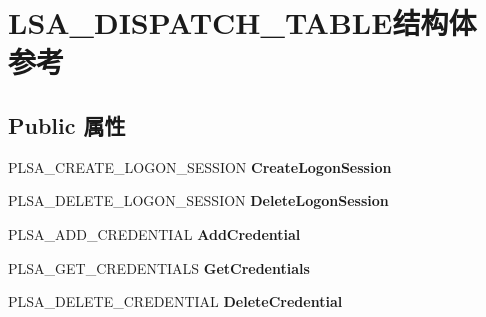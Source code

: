 \hypertarget{struct_l_s_a___d_i_s_p_a_t_c_h___t_a_b_l_e}{}\section{L\+S\+A\+\_\+\+D\+I\+S\+P\+A\+T\+C\+H\+\_\+\+T\+A\+B\+L\+E结构体 参考}
\label{struct_l_s_a___d_i_s_p_a_t_c_h___t_a_b_l_e}
\subsection*{Public 属性}
\begin{DoxyCompactItemize}
\item 
\mbox{\label{struct_l_s_a___d_i_s_p_a_t_c_h___t_a_b_l_e_a252ce35f4f1f431226b72b2f27a5a7ea}} 
P\+L\+S\+A\+\_\+\+C\+R\+E\+A\+T\+E\+\_\+\+L\+O\+G\+O\+N\+\_\+\+S\+E\+S\+S\+I\+ON {\bfseries Create\+Logon\+Session}
\item 
\mbox{\label{struct_l_s_a___d_i_s_p_a_t_c_h___t_a_b_l_e_ad8d00ef57396a62d2097e3bf4f0e5b0e}} 
P\+L\+S\+A\+\_\+\+D\+E\+L\+E\+T\+E\+\_\+\+L\+O\+G\+O\+N\+\_\+\+S\+E\+S\+S\+I\+ON {\bfseries Delete\+Logon\+Session}
\item 
\mbox{\label{struct_l_s_a___d_i_s_p_a_t_c_h___t_a_b_l_e_aef3fdf550de3a382d795185a61c014ce}} 
P\+L\+S\+A\+\_\+\+A\+D\+D\+\_\+\+C\+R\+E\+D\+E\+N\+T\+I\+AL {\bfseries Add\+Credential}
\item 
\mbox{\label{struct_l_s_a___d_i_s_p_a_t_c_h___t_a_b_l_e_a2191704083229ce604b3c900732f0fd2}} 
P\+L\+S\+A\+\_\+\+G\+E\+T\+\_\+\+C\+R\+E\+D\+E\+N\+T\+I\+A\+LS {\bfseries Get\+Credentials}
\item 
\mbox{\label{struct_l_s_a___d_i_s_p_a_t_c_h___t_a_b_l_e_a0de2251c94edaced63a5b216b88b53a3}} 
P\+L\+S\+A\+\_\+\+D\+E\+L\+E\+T\+E\+\_\+\+C\+R\+E\+D\+E\+N\+T\+I\+AL {\bfseries Delete\+Credential}
\item 
\mbox{\label{struct_l_s_a___d_i_s_p_a_t_c_h___t_a_b_l_e_a7bc15bd42294c11ff9107af3e5a78066}} 

\end{DoxyCompactItemize}
